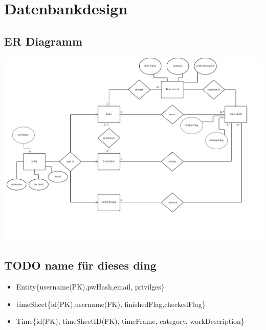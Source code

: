 \section{Datenbankdesign}

\subsection{ER Diagramm}
    \includegraphics[width=\linewidth]{Diagramms/erDiagramm}\\
\subsection{TODO name für dieses ding}
    \begin{itemize}
        \item Entity\{username(PK),pwHash,email, privilges\}
        \item timeSheet\{id(PK),username(FK), finishedFlag,checkedFlag\}
        \item Time\{id(PK), timeSheetID(FK), timeFrame, category, workDescription\}
    \end{itemize}
